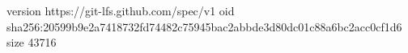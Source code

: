 version https://git-lfs.github.com/spec/v1
oid sha256:20599b9e2a7418732fd74482c75945bac2abbde3d80dc01c88a6bc2acc0cf1d6
size 43716
